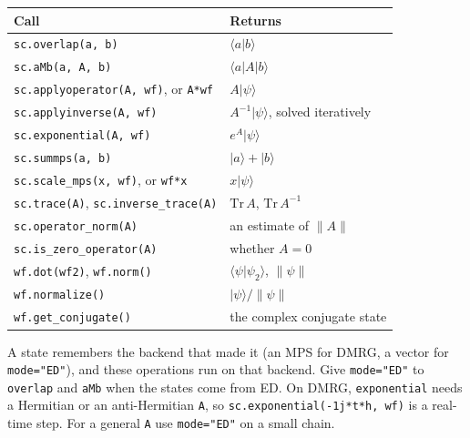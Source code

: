 \documentclass[11pt]{article}
\begin{document}
{\footnotesize
\begin{longtable}[]{@{}
  >{\raggedright\arraybackslash}p{}
  >{\raggedright\arraybackslash}p{}@{}}
\toprule\noalign{}
\begin{minipage}[b]{\linewidth}\raggedright
Call
\end{minipage} & \begin{minipage}[b]{\linewidth}\raggedright
Returns
\end{minipage} \\
\midrule\noalign{}
\endhead
\bottomrule\noalign{}
\endlastfoot
\texttt{sc.\allowbreak{}overlap(a,\ b)} & \(\langle a|b\rangle\) \\
\texttt{sc.\allowbreak{}aMb(a,\ A,\ b)} & \(\langle a|A|b\rangle\) \\
\texttt{sc.\allowbreak{}applyoperator(A,\ wf)}, or \texttt{A*wf} & \(A|\psi\rangle\) \\
\texttt{sc.\allowbreak{}applyinverse(A,\ wf)} & \(A^{-1}|\psi\rangle\), solved iteratively \\
\texttt{sc.\allowbreak{}exponential(A,\ wf)} & \(e^{A}|\psi\rangle\) \\
\texttt{sc.\allowbreak{}summps(a,\ b)} & \(|a\rangle+|b\rangle\) \\
\texttt{sc.\allowbreak{}scale\_\allowbreak{}mps(x,\ wf)}, or \texttt{wf*x} & \(x|\psi\rangle\) \\
\texttt{sc.\allowbreak{}trace(A)}, \texttt{sc.\allowbreak{}inverse\_\allowbreak{}trace(A)} & \(\mathrm{Tr}\,A\), \(\mathrm{Tr}\,A^{-1}\) \\
\texttt{sc.\allowbreak{}operator\_\allowbreak{}norm(A)} & an estimate of \(\lVert A\rVert\) \\
\texttt{sc.\allowbreak{}is\_\allowbreak{}zero\_\allowbreak{}operator(A)} & whether \(A=0\) \\
\texttt{wf.\allowbreak{}dot(wf2)}, \texttt{wf.\allowbreak{}norm()} & \(\langle\psi|\psi_2\rangle\), \(\lVert\psi\rVert\) \\
\texttt{wf.\allowbreak{}normalize()} & \(|\psi\rangle/\lVert\psi\rVert\) \\
\texttt{wf.\allowbreak{}get\_\allowbreak{}conjugate()} & the complex conjugate state \\
\end{longtable}
}

A state remembers the backend that made it (an MPS for DMRG, a vector for
\texttt{mode="ED"}), and these operations run on that backend. Give \texttt{mode="ED"}
to \texttt{overlap} and \texttt{aMb} when the states come from ED. On DMRG,
\texttt{exponential} needs a Hermitian or an anti-Hermitian \texttt{A}, so
\texttt{sc.\allowbreak{}exponential(-1j*t*h,\ wf)} is a real-time step. For a general \texttt{A} use
\texttt{mode="ED"} on a small chain.
\end{document}
